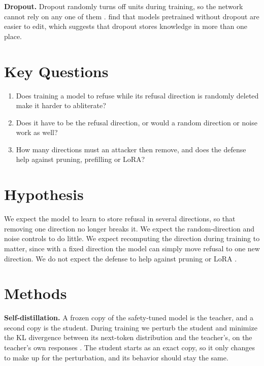 \documentclass[12pt]{article}
\begin{document}
\textbf{Dropout.}
Dropout randomly turns off units during training, so the network cannot rely on any one of them \citep{srivastava2014dropout}.
\citet{liu2025dropdropout} find that models pretrained without dropout are easier to edit, which suggests that dropout stores knowledge in more than one place.

\section{Key Questions}
\begin{enumerate}
  \item Does training a model to refuse while its refusal direction is randomly deleted make it harder to abliterate?
  \item Does it have to be the refusal direction, or would a random direction or noise work as well?
  \item How many directions must an attacker then remove, and does the defense help against pruning, prefilling or LoRA?
\end{enumerate}

\section{Hypothesis}
We expect the model to learn to store refusal in several directions, so that removing one direction no longer breaks it.
We expect the random-direction and noise controls to do little.
We expect recomputing the direction during training to matter, since with a fixed direction the model can simply move refusal to one new direction.
We do not expect the defense to help against pruning or LoRA \citep{qi2024finetuning,kuo2026simple}.

\section{Methods}
\textbf{Self-distillation.}
A frozen copy of the safety-tuned model is the teacher, and a second copy is the student.
During training we perturb the student and minimize the KL divergence between its next-token distribution and the teacher's, on the teacher's own responses \citep{hinton2015distilling}.
The student starts as an exact copy, so it only changes to make up for the perturbation, and its behavior should stay the same.
\end{document}
